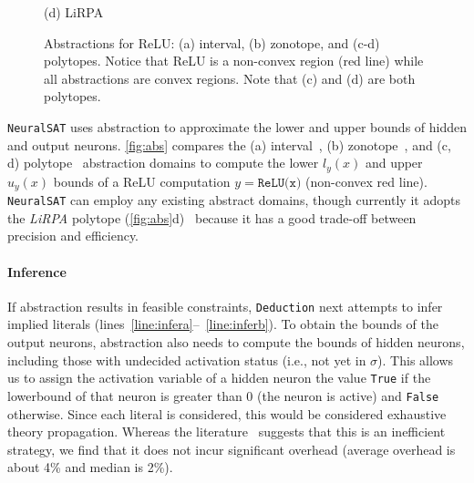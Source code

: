 \documentclass[oneside,11pt,dvipsnames]{book}
\numberwithin{equation}{section}
\theoremstyle{definition}
\theoremstyle{remark}
\newcommand{\hd}[1]{\iftoggle{usecomment}{{\color{blue}{[HD]: #1}}}{}}
\newcommand{\tool}{\texttt{NeuralSAT}}
\begin{document}
\begin{figure}
\begin{minipage}[b]{1\linewidth}
\begin{minipage}[c]{0.24\linewidth}
            \vspace*{-10mm}
            \caption*{(d) LiRPA}
        \end{minipage}
        \vspace*{-3mm}
        \caption{Abstractions for ReLU: (a) interval, (b) zonotope, and (c-d) polytopes. Notice that ReLU is a non-convex region (red line) while all abstractions are convex regions. Note that (c) and (d) are both polytopes.}\label{fig:abs}
    \end{minipage}
\end{figure}

\tool{} uses abstraction to approximate the lower and upper bounds of hidden and output neurons.
\autoref{fig:abs} compares the (a) interval~\cite{wang2018formal}, (b) zonotope~\cite{singh2018fast}, and (c, d) polytope~\cite{xu2020fast,singh2019abstract,wang2021beta} abstraction domains to compute the lower $l_y(x)$ and upper $u_y(x)$ bounds of a ReLU computation $y=\texttt{ReLU(x)}$ (non-convex red line).
\tool{} can employ any existing abstract domains, though currently it adopts the \emph{LiRPA} polytope (\autoref{fig:abs}d)~\cite{xu2020fast,xu2020automatic,wang2021beta} because it has a good trade-off between precision and efficiency.


\paragraph{Inference} If abstraction results in feasible constraints, \texttt{Deduction} next attempts to infer implied literals (lines~\ref{line:infera}--~\ref{line:inferb}). To obtain the bounds of the output neurons, abstraction also needs to compute the bounds of hidden neurons, including those with undecided activation status (i.e., not yet in $\sigma$).
This allows us to assign the activation variable of a hidden neuron the value
\texttt{True} if the lowerbound of that neuron is greater than 0 (the neuron is active) and
\texttt{False} otherwise.
Since each literal is considered, this would be considered exhaustive theory propagation.  Whereas the literature~\cite{nieuwenhuis2006solving,kroening2016decision} suggests that this is an inefficient strategy, we find that it does not incur significant overhead (average overhead is about 4\% and median is 2\%).
\end{document}

